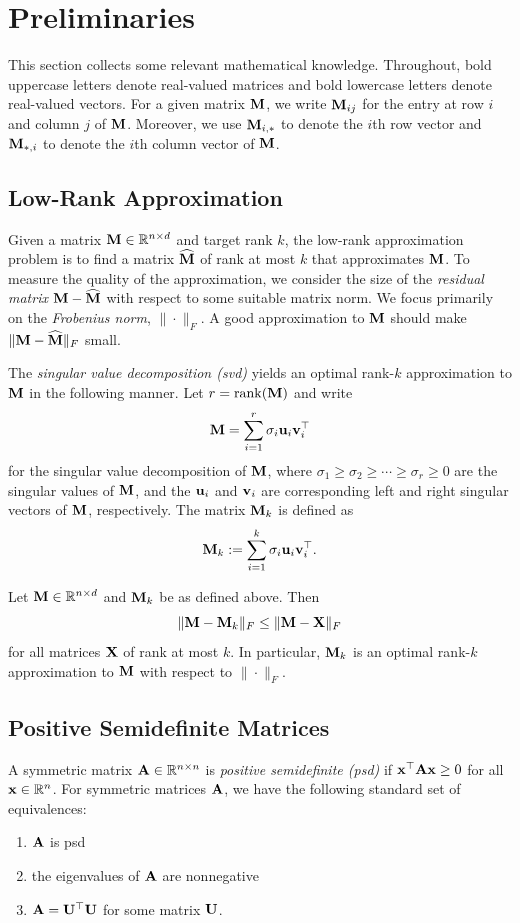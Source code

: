 \section{Preliminaries}
This section collects some relevant mathematical knowledge. Throughout, bold uppercase letters denote real-valued matrices and bold lowercase letters denote real-valued vectors. For a given matrix $\mathbf{M}$, we write $\mathbf{M}_{ij}$ for the entry at row $i$ and column $j$ of $\mathbf{M}$. Moreover, we use $\mathbf{M}_{i, *}$ to denote the $i$th row vector and $\mathbf{M}_{*, i}$ to denote the $i$th column vector of $\mathbf{M}$.
\subsection{Low-Rank Approximation}
Given a matrix $\mathbf{M}\in \mathbb{R}^{n\times d}$ and target rank $k$, the low-rank approximation problem is to find a matrix $\widehat{\mathbf{M}}$ of rank at most $k$ that approximates $\mathbf{M}$. To measure the quality of the approximation, we consider the size of the \textit{residual matrix} $\mathbf{M} - \widehat {\mathbf{M}}$ with respect to some suitable matrix norm. We focus primarily on the \textit{Frobenius norm}, $\|\cdot\|_F$. A good approximation to $\mathbf{M}$ should make $\|\mathbf{M} - \widehat{\mathbf{M}}\|_F$ small. 

The \textit{singular value decomposition (svd)} yields an optimal rank-$k$ approximation to $\mathbf{M}$ in the following manner. 
Let $r = \rank(\mathbf{M})$ and write
\[\mathbf{M} = \sum_{i=1}^r\sigma_i\mathbf{u}_i\mathbf{v}_i^\top\]
for the singular value decomposition of $\mathbf{M}$, where $\sigma_1\geq\sigma_2\geq\cdots\geq \sigma_r\geq 0$ are the singular values of $\mathbf{M}$, and the $\mathbf{u}_i$ and $\mathbf{v}_i$ are corresponding left and right singular vectors of $\mathbf{M}$, respectively. The matrix $\mathbf{M}_k$ is defined as
\[\mathbf{M}_k := \sum_{i=1}^k \sigma_i\mathbf{u}_i\mathbf{v}_i^\top.\]

\begin{fact}
    Let $\mathbf{M}\in\mathbb{R}^{n\times d}$ and $\mathbf{M}_k$ be as defined above. Then
    \[\|\mathbf{M}-\mathbf{M}_k\|_F\leq \|\mathbf{M}-\mathbf{X}\|_F\]
    for all matrices $\mathbf{X}$ of rank at most $k$. In particular, $\mathbf{M}_k$ is an optimal rank-$k$ approximation to $\mathbf{M}$ with respect to $\|\cdot\|_F$.
\end{fact}



\subsection{Positive Semidefinite Matrices}
A symmetric matrix $\mathbf{A}\in\mathbb{R}^{n\times n}$ is \textit{positive semidefinite (psd)} if $\mathbf{x}^\top\mathbf{A}\mathbf{x}\geq 0$ for all $\mathbf{x}\in\mathbb{R}^n$. For symmetric matrices $\mathbf{A}$, we have the following standard set of equivalences:
\begin{enumerate}[itemsep=0.35em,
    topsep=0.45em,
    parsep=0pt]
    \item $\mathbf{A}$ is psd
    \item the eigenvalues of $\mathbf{A}$ are nonnegative
    \item $\mathbf{A} = \mathbf{U}^\top\mathbf{U}$ for some matrix $\mathbf{U}$.
\end{enumerate}

